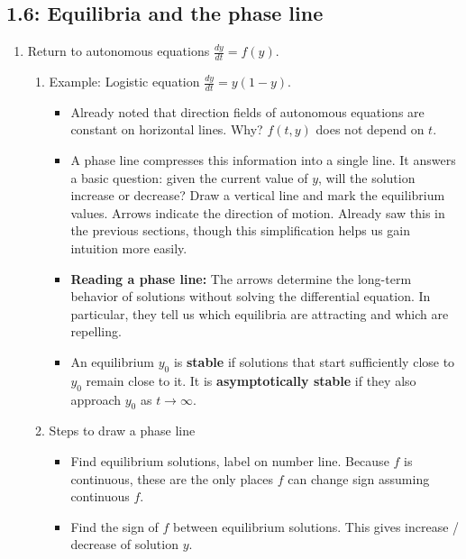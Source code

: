 \documentclass{article}
\newcommand{\ds}{\displaystyle}
\begin{document}
\subsection{1.6: Equilibria and the phase line}

\begin{enumerate}

\item Return to autonomous equations $\ds \frac{dy}{dt} = f(y)$. 
\begin{enumerate}
\item Example: Logistic equation $\ds \frac{dy}{dt}=y(1-y)$. 
\begin{itemize}
\item Already noted that direction fields of autonomous equations are constant on horizontal lines. Why? $f(t,y)$ does not depend on $t$.

\item A phase line compresses this information into a single line. It answers a
basic question: given the current value of $y$, will the solution increase or
decrease? Draw a vertical line and mark the equilibrium values. Arrows indicate
the direction of motion. Already saw this in the previous sections, though this simplification helps us gain intuition more easily.

\item \textbf{Reading a phase line:} The arrows determine the long-term
behavior of solutions without solving the differential equation. In particular,
they tell us which equilibria are attracting and which are repelling.

\item An equilibrium $y_0$ is \textbf{stable} if solutions that start
sufficiently close to $y_0$ remain close to it. It is \textbf{asymptotically
stable} if they also approach $y_0$ as $t\rightarrow\infty$.
\end{itemize} 


\item Steps to draw a phase line
\begin{itemize}
\item Find equilibrium solutions, label on number line. Because $f$ is continuous, these are the only places $f$ can change sign assuming continuous $f$.
\item Find the sign of $f$ between equilibrium solutions. This gives increase / decrease of solution $y$.
\end{itemize} 
\end{enumerate}



\end{enumerate}
\end{document}
